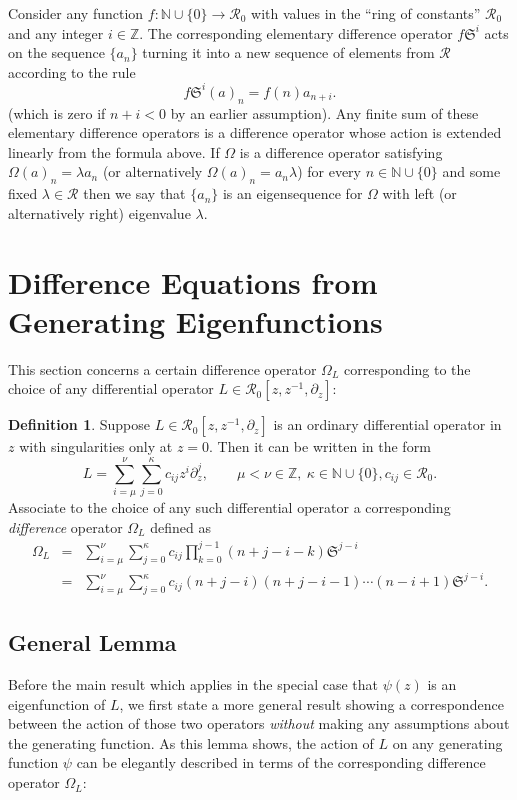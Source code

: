 \documentclass{amsart}
\theoremstyle{definition}
\newtheorem{definition}[theorem]{Definition}
\theoremstyle{remark}
\numberwithin{equation}{section}
\def\R{\mathcal{R}}
\def\S{\mathfrak{S}}
\def\Z{\mathbb{Z}}
\def\N{\mathbb{N}}
\def\zmin{\mu}
\def\zmax{\nu}
\def\dmax{\kappa}
\begin{document}
Consider any function
$f:\N\cup\{0\}\to\R_0$ with values in the ``ring of
constants'' $\R_0$ and any integer $i\in \Z$.
The corresponding elementary difference operator $f \S^i$ acts on
 the sequence
$\{a_n\}$ turning it into a new sequence of elements from $\R$ according to the rule
\begin{equation}
  f\S^i(a)_n=f(n)a_{n+i}.
\end{equation}
(which is zero if $n+i<0$ by an earlier assumption).  Any finite sum
of these elementary difference operators is a difference operator
whose action is extended linearly from the formula above.
If $\Omega$
is a difference operator satisfying $\Omega(a)_n=\lambda a_n$ (or alternatively
$\Omega(a)_n=a_n\lambda$) for every $n\in \N\cup\{0\}$ and some
fixed $\lambda\in\R$ then we say that $\{a_n\}$ is an eigensequence
for $\Omega$ with left (or alternatively right) eigenvalue $\lambda$.


\section{Difference Equations from Generating Eigenfunctions}
This section concerns a certain
difference operator $\Omega_L$ corresponding to the choice of any
differential operator $L\in\R_0[z,z^{-1},\partial_z]$:
\begin{definition}\label{def:LOmega}
Suppose $L\in \R_0[z,z^{-1},\partial_z]$ is an ordinary differential
operator in $z$ with singularities only at $z=0$.   Then it can be written in the form
$$
L=\sum_{i=\zmin}^{\zmax}\sum_{j=0}^{\dmax} c_{ij}z^{i}\partial_z^{j},
\qquad
\zmin<\zmax\in\Z,\ \dmax\in\N\cup\{0\}, c_{ij}\in\R_0.
$$
Associate to the choice of any such differential operator a
corresponding \textit{difference} operator $\Omega_L$ defined as
\begin{eqnarray*}
\Omega_L&=&\sum_{i=\zmin}^{\zmax}\sum_{j=0}^{\dmax} c_{ij}
\prod_{k=0}^{j-1}(n+j-i-k) \S^{j-i}  \\
  &=&\sum_{i=\zmin}^{\zmax}\sum_{j=0}^{\dmax} c_{ij}
(n+j-i)(n+j-i-1)\cdots(n-i+1) \S^{j-i}.
\end{eqnarray*}
\end{definition}

  \subsection{General Lemma}
  Before the main result which applies in the special case
  that $\psi(z)$ is an eigenfunction of $L$, we first state
a more general result showing a correspondence between the action of
those two operators \textit{without} making any assumptions about the
generating function.
As this lemma shows, 
the action of $L$ on any generating function $\psi$ can
    be elegantly described in terms of the corresponding difference operator $\Omega_L$:
\end{document}
